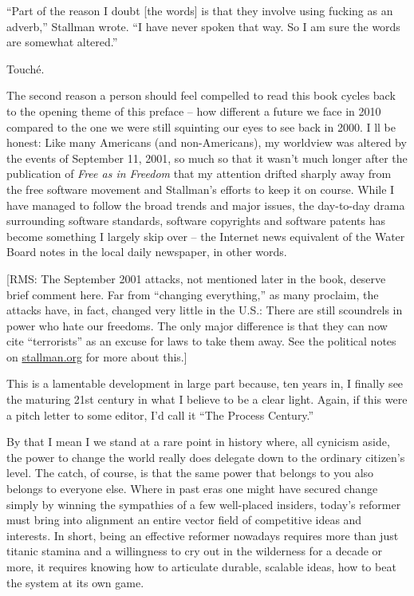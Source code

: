 ``Part of the reason I doubt [the words] is that they involve using
fucking as an adverb,'' Stallman wrote. ``I have never spoken that
way. So I am sure the words are somewhat altered.''

Touché.

The second reason a person should feel compelled to read this book
cycles back to the opening theme of this preface -- how different a
future we face in 2010 compared to the one we were still squinting our
eyes to see back in 2000. I ll be honest: Like many Americans (and
non-Americans), my worldview was altered by the events of September
11, 2001, so much so that it wasn't much longer after the publication
of \textit{Free as in Freedom} that my attention drifted sharply away
from the free software movement and Stallman's efforts to keep it on
course. While I have managed to follow the broad trends and major
issues, the day-to-day drama surrounding software standards, software
copyrights and software patents has become something I largely skip
over -- the Internet news equivalent of the Water Board notes in the
local daily newspaper, in other words.

[RMS: The September 2001 attacks, not mentioned later in the book,
  deserve brief comment here. Far from ``changing everything,'' as
  many proclaim, the attacks have, in fact, changed very little in the
  U.S.: There are still scoundrels in power who hate our freedoms. The
  only major difference is that they can now cite ``terrorists'' as an
  excuse for laws to take them away. See the political notes on
  \url{stallman.org} for more about this.]

This is a lamentable development in large part because, ten years in,
I finally see the maturing 21st century in what I believe to be a
clear light. Again, if this were a pitch letter to some editor, I'd
call it ``The Process Century.''

By that I mean I we stand at a rare point in history where, all
cynicism aside, the power to change the world really does delegate
down to the ordinary citizen's level. The catch, of course, is that
the same power that belongs to you also belongs to everyone else.
Where in past eras one might have secured change simply by winning the
sympathies of a few well-placed insiders, today's reformer must bring
into alignment an entire vector field of competitive ideas and
interests. In short, being an effective reformer nowadays requires
more than just titanic stamina and a willingness to cry out in the
wilderness for a decade or more, it requires knowing how to articulate
durable, scalable ideas, how to beat the system at its own game.

